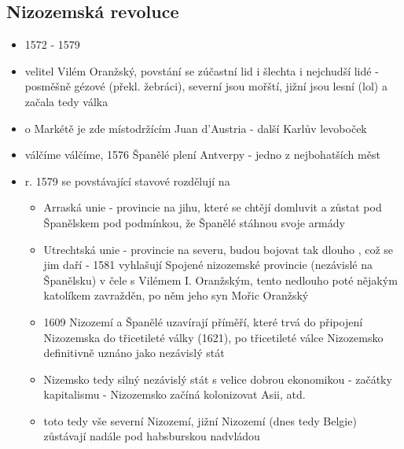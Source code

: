 \documentclass{article}
\begin{document}
\subsection{Nizozemská revoluce}
\begin{itemize}
  \item 1572 - 1579
  \item velitel Vilém Oranžský, povstání se zúčastní lid i šlechta i nejchudší lidé - posměšně gézové (překl. žebráci), severní jsou mořští, jižní jsou lesní (lol) a začala tedy válka
  \item o Markétě je zde místodržícím Juan d'Austria - další Karlův levoboček
  \item válčíme válčíme, 1576 Španělé plení Antverpy - jedno z nejbohatších měst
  \item r. 1579 se povstávající stavové rozdělují na
  \begin{itemize}
    \item Arraská unie - provincie na jihu, které se chtějí domluvit a zůstat pod Španělskem pod podmínkou, že Španělé stáhnou svoje armády
    \item Utrechtská unie - provincie na severu, budou bojovat tak dlouho , což se jim daří - 1581 vyhlašují Spojené nizozemské provincie (nezávislé na Španělsku) v čele s Vilémem I. Oranžským, tento nedlouho poté nějakým katolíkem zavražděn, po něm jeho syn Mořic Oranžský
    \item 1609 Nizozemí a Španělé uzavírají příměří, které trvá do připojení Nizozemska do třicetileté války (1621), po třicetileté válce Nizozemsko definitivně uznáno jako nezávislý stát
    \item Nizemsko tedy silný nezávislý stát s velice dobrou ekonomikou - začátky kapitalismu - Nizozemsko začíná kolonizovat Asii, atd.
    \item toto tedy vše severní Nizozemí, jižní Nizozemí (dnes tedy Belgie) zůstávají nadále pod habsburskou nadvládou
  \end{itemize}
\end{itemize}
\end{document}
